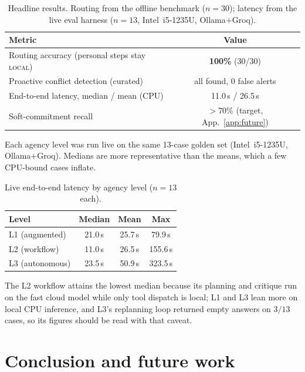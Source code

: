 \documentclass{ecai}
\begin{document}
\begin{table}[h]
\caption{Headline results. Routing from the offline benchmark ($n{=}30$);
latency from the live eval harness ($n{=}13$, Intel~i5-1235U, Ollama${+}$Groq).}
\centering
\begin{tabular}{lc}
\toprule
Metric & Value \\
\midrule
Routing accuracy (personal steps stay \textsc{local}) & \textbf{100\%} (30/30) \\
Proactive conflict detection (curated)                & all found, 0 false alerts \\
End-to-end latency, median / mean (CPU)               & 11.0\,s / 26.5\,s \\
Soft-commitment recall                                & $>$70\% (target, App.~\ref{app:future}) \\
\bottomrule
\end{tabular}
\label{tab:results}
\end{table}


Each agency level was run live on the same
13-case golden set (Intel~i5-1235U, Ollama${+}$Groq). Medians are more
representative than the means, which a few CPU-bound cases inflate.

\begin{table}[h]
\centering
\caption{Live end-to-end latency by agency level ($n{=}13$ each).}
\label{tab:latency}
\begin{tabular}{lccc}
\toprule
Level & Median & Mean & Max \\
\midrule
L1 (augmented)  & 21.0\,s & 25.7\,s &  79.9\,s \\
L2 (workflow)   & 11.0\,s & 26.5\,s & 155.6\,s \\
L3 (autonomous) & 23.5\,s & 50.9\,s & 323.5\,s \\
\bottomrule
\end{tabular}
\end{table}

The L2 workflow attains the lowest median because its planning and critique run on
the fast cloud model while only tool dispatch is local; L1 and L3 lean more on
local CPU inference, and L3's replanning loop returned empty answers on $3/13$
cases, so its figures should be read with that caveat.




\section{Conclusion and future work}\label{sec:conclusion}
\end{document}
